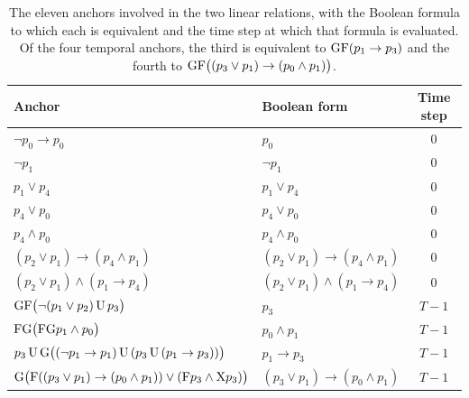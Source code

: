 \documentclass[titlepage,a4paper,11pt]{report}
\begin{document}
    \begin{table}[ht]
        \centering
        \caption{The eleven anchors involved in the two linear relations, with the Boolean formula to which each is equivalent and the time step at which that formula is evaluated. Of the four temporal anchors, the third is equivalent to $\text{G}\text{F}(p_1\to p_3)$ and the fourth to $\text{G}\text{F}\bigl((p_3\lor p_1)\to(p_0\land p_1)\bigr)$.}
        \label{tab:geom_dependencies}
        \begin{tabular}{llc}
            \toprule
            Anchor & Boolean form & Time step \\
            \midrule
            $\neg p_0\to p_0$ & $p_0$ & $0$ \\
            $\neg p_1$ & $\neg p_1$ & $0$ \\
            $p_1\lor p_4$ & $p_1\lor p_4$ & $0$ \\
            $p_4\lor p_0$ & $p_4\lor p_0$ & $0$ \\
            $p_4\land p_0$ & $p_4\land p_0$ & $0$ \\
            $(p_2\lor p_1)\to(p_4\land p_1)$ & $(p_2\lor p_1)\to(p_4\land p_1)$ & $0$ \\
            $(p_2\lor p_1)\land(p_1\to p_4)$ & $(p_2\lor p_1)\land(p_1\to p_4)$ & $0$ \\
            \midrule
            $\text{G}\text{F}\bigl(\neg(p_1\lor p_2)\,\text{U}\,p_3\bigr)$ & $p_3$ & $T-1$ \\
            $\text{F}\text{G}\bigl(\text{F}\text{G} p_1\land p_0\bigr)$ & $p_0\land p_1$ & $T-1$ \\
            $p_3\,\text{U}\,\text{G}\bigl((\neg p_1\to p_1)\,\text{U}\,(p_3\,\text{U}\,(p_1\to p_3))\bigr)$ & $p_1\to p_3$ & $T-1$ \\
            $\text{G}\bigl(\text{F}((p_3\lor p_1)\to(p_0\land p_1))\lor(\text{F} p_3\land\text{X} p_3)\bigr)$ & $(p_3\lor p_1)\to(p_0\land p_1)$ & $T-1$ \\
            \bottomrule
        \end{tabular}
    \end{table}
\end{document}
